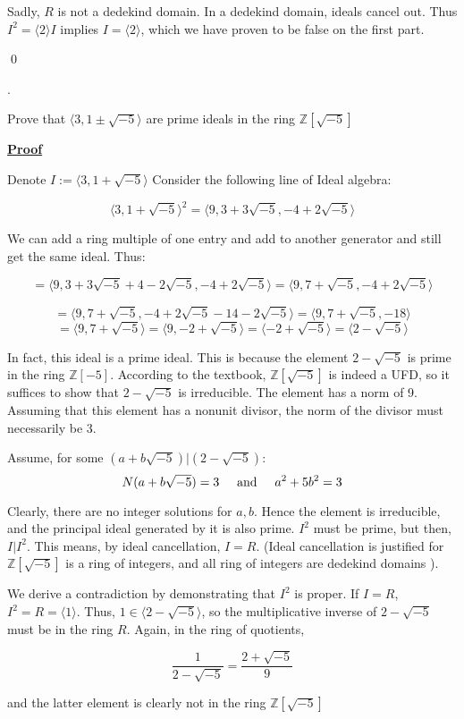 \documentclass{article}
\def\ZZ{{\mathbb{Z}}}
\def\contradiction{{\lightning}}
\newcounter{problemcnt}
\newcommand{\Problem}{{
    \vspace{5mm}
    \stepcounter{problemcnt}
    \noindent
    \arabic{problemcnt}. 
}
}
\newcommand{\Proof}{{
    \vspace{2mm}
    \noindent
    \textbf{
    \underline{Proof}}
}
}
\newcommand{\textAnd}{
    \hspace{5mm}
    \textrm{and}
    \hspace{5mm}
}
\newcommand{\<}{{{
    \langle
}}}
\def\>{{{
    \rangle
}}}
\def\ZZ{{\mathbb{Z}}}
\begin{document}
Sadly, $R$ is not a dedekind domain. In a dedekind domain, 
ideals cancel out. Thus $I^2 = \<2\>I$ implies $I = \<2\>$, 
which we have proven to be false on the first part. 
\contradiction

\qed

\newpage

\Problem
Prove that $\<3, 1\pm \sqrt{-5}\>$ are prime ideals in the ring 
$\ZZ[\sqrt{-5}]$

\Proof
Denote $I:=\<3, 1+ \sqrt{-5}\>$
Consider the following line of Ideal algebra:

\[
    \<3, 1+\sqrt{-5}\>^2 = \<9, 3+3\sqrt{-5}, -4+2\sqrt{-5}\>
\]

We can add a ring multiple of one entry and add to another generator 
and still get the same ideal. Thus:

\[
    = \<9, 3+3\sqrt{-5} +4 - 2\sqrt{-5}, -4+2\sqrt{-5}\> 
    = \<9, 7+\sqrt{-5}, -4+2\sqrt{-5}\> 
\]

\[
    = \<9, 7+\sqrt{-5}, -4+2\sqrt{-5}-14-2\sqrt{-5}\>
    = \<9, 7+\sqrt{-5}, -18\> 
\]
\[
    = \<9, 7+\sqrt{-5}\> = \<9, -2+\sqrt{-5}\>
    = \<-2+\sqrt{-5}\> = \<2-\sqrt{-5}\>
\]

In fact, this ideal is a prime ideal. This is because the element 
$2-\sqrt{-5}$ is prime in the ring $\ZZ[-5]$. According to the textbook, 
$\ZZ[\sqrt{-5}]$ is indeed a UFD, so it suffices to show that 
$2-\sqrt{-5}$ is irreducible. The element has a norm of 9. 
Assuming that this element has a nonunit divisor, the norm of 
the divisor must necessarily be 3. 

Assume, for some $(a+b\sqrt{-5}) | (2-\sqrt{-5})$:
\[
    N(a+b\sqrt{-5}) = 3 \textAnd a^2+5b^2 = 3
\]

Clearly, there are no integer solutions for $a, b$. 
Hence the element is irreducible, and the principal ideal 
generated by it is also prime. $I^2$ must be prime, but then, 
$I|I^2$. This means, by ideal cancellation, $I = R$. 
(Ideal cancellation is justified for $\ZZ[\sqrt{-5}]$ is a ring 
of integers, and all ring of integers are dedekind domains
). 

We derive a contradiction by demonstrating that 
$I^2$ is proper. If $I = R$, $I^2 = R = \<1\>$. Thus, 
$1 \in \<2-\sqrt{-5}\>$, so the multiplicative 
inverse of $2-\sqrt{-5}$ must be in the ring $R$. 
Again, in the ring of quotients, 

\[
    \frac{1}{2-\sqrt{-5}} = \frac{2+\sqrt{-5}}{9}
\]

and the latter element is clearly not in the ring 
$\ZZ[\sqrt{-5}]$ \contradiction 
\end{document}

